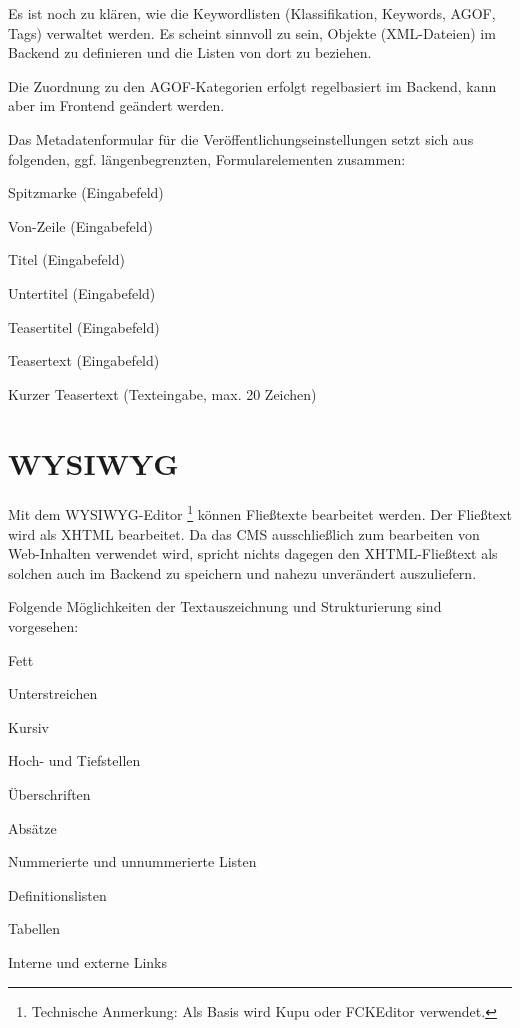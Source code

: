 Es ist noch zu klären, wie die Keywordlisten (Klassifikation, Keywords, AGOF,
Tags) verwaltet werden. Es scheint sinnvoll zu sein, Objekte (XML-Dateien) im
Backend zu definieren und die Listen von dort zu beziehen.

Die Zuordnung zu den AGOF-Kategorien erfolgt regelbasiert im Backend, kann
aber im Frontend geändert werden.

Das Metadatenformular für die Veröffentlichungseinstellungen setzt sich aus
folgenden, ggf. längenbegrenzten, Formularelementen zusammen:

\begin{compactitem}
 \item Spitzmarke (Eingabefeld)
 \item Von-Zeile (Eingabefeld)
 \item Titel (Eingabefeld)
 \item Untertitel (Eingabefeld)
 \item Teasertitel (Eingabefeld)
 \item Teasertext (Eingabefeld)
 \item Kurzer Teasertext (Texteingabe, max. 20 Zeichen)
\end{compactitem}



\section{WYSIWYG} \label{sec-wysiwyg}


Mit dem WYSIWYG-Editor \footnote{Technische Anmerkung: Als Basis wird Kupu
oder FCKEditor verwendet.} können Fließtexte bearbeitet werden. Der Fließtext
wird als XHTML bearbeitet. Da das CMS aus\/schließlich zum bearbeiten von
Web-Inhalten verwendet wird, spricht nichts dagegen den XHTML-Fließtext als
solchen auch im Backend zu speichern und nahezu unverändert auszuliefern.

Folgende Möglichkeiten der Textauszeichnung und Strukturierung sind vorgesehen:

\begin{compactitem}
  \item Fett
  \item Unterstreichen
  \item Kursiv
  \item Hoch- und Tiefstellen
  \item Überschriften
  \item Absätze
  \item Nummerierte und unnummerierte Listen
  \item Definitionslisten
  \item Tabellen
  \item Interne und externe Links
\end{compactitem}

